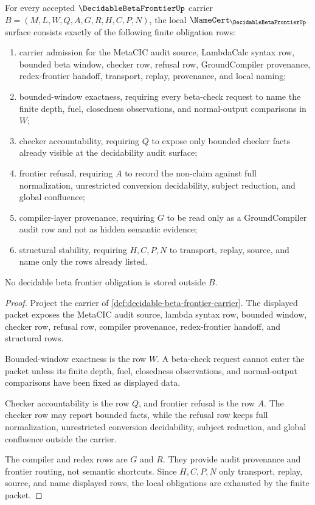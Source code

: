 \begin{theorem}
\label{thm:decidable-beta-frontier-namecert-obligations}
For every accepted $\DecidableBetaFrontierUp$ carrier $B=(M,L,W,Q,A,G,R,H,C,P,N)$, the local $\NameCert_{\DecidableBetaFrontierUp}$ surface consists exactly of the following finite obligation rows:
\begin{enumerate}
\item carrier admission for the MetaCIC audit source, LambdaCalc syntax row, bounded beta window, checker row, refusal row, GroundCompiler provenance, redex-frontier handoff, transport, replay, provenance, and local naming;
\item bounded-window exactness, requiring every beta-check request to name the finite depth, fuel, closedness observations, and normal-output comparisons in $W$;
\item checker accountability, requiring $Q$ to expose only bounded checker facts already visible at the decidability audit surface;
\item frontier refusal, requiring $A$ to record the non-claim against full normalization, unrestricted conversion decidability, subject reduction, and global confluence;
\item compiler-layer provenance, requiring $G$ to be read only as a GroundCompiler audit row and not as hidden semantic evidence;
\item structural stability, requiring $H,C,P,N$ to transport, replay, source, and name only the rows already listed.
\end{enumerate}
No decidable beta frontier obligation is stored outside $B$.
\end{theorem}
\begin{proof}
Project the carrier of \autoref{def:decidable-beta-frontier-carrier}. The displayed packet exposes the MetaCIC audit source, lambda syntax row, bounded window, checker row, refusal row, compiler provenance, redex-frontier handoff, and structural rows.

Bounded-window exactness is the row $W$. A beta-check request cannot enter the packet unless its finite depth, fuel, closedness observations, and normal-output comparisons have been fixed as displayed data.

Checker accountability is the row $Q$, and frontier refusal is the row $A$. The checker row may report bounded facts, while the refusal row keeps full normalization, unrestricted conversion decidability, subject reduction, and global confluence outside the carrier.

The compiler and redex rows are $G$ and $R$. They provide audit provenance and frontier routing, not semantic shortcuts. Since $H,C,P,N$ only transport, replay, source, and name displayed rows, the local obligations are exhausted by the finite packet.
\end{proof}

